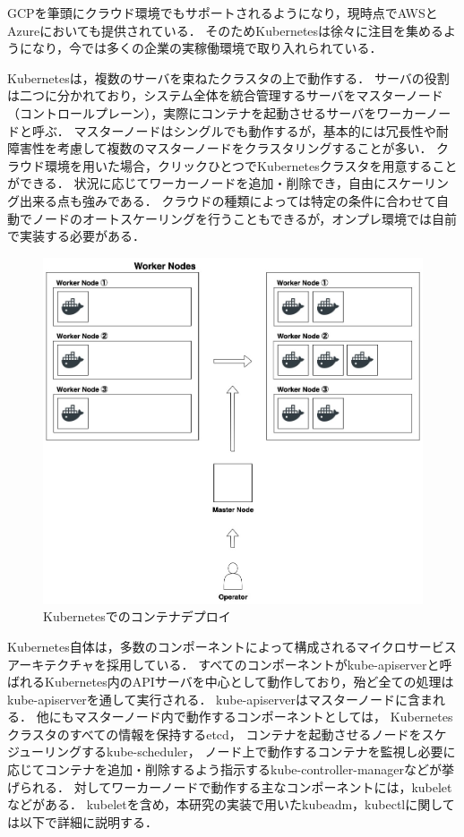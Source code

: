 GCPを筆頭にクラウド環境でもサポートされるようになり，現時点でAWSとAzureにおいても提供されている．
そのためKubernetesは徐々に注目を集めるようになり，今では多くの企業の実稼働環境で取り入れられている．

Kubernetesは，複数のサーバを束ねたクラスタの上で動作する．
サーバの役割は二つに分かれており，システム全体を統合管理するサーバをマスターノード（コントロールプレーン），実際にコンテナを起動させるサーバをワーカーノードと呼ぶ．
マスターノードはシングルでも動作するが，基本的には冗長性や耐障害性を考慮して複数のマスターノードをクラスタリングすることが多い．
クラウド環境を用いた場合，クリックひとつでKubernetesクラスタを用意することができる．
状況に応じてワーカーノードを追加・削除でき，自由にスケーリング出来る点も強みである．
クラウドの種類によっては特定の条件に合わせて自動でノードのオートスケーリングを行うこともできるが，オンプレ環境では自前で実装する必要がある．

\begin{figure}[htbp]
\begin{center}
    \includegraphics[width=\textwidth]{./figures/k8s-deploy-container.jpg}
    \caption{Kubernetesでのコンテナデプロイ}
\end{center}
\end{figure}

Kubernetes自体は，多数のコンポーネントによって構成されるマイクロサービスアーキテクチャを採用している．
すべてのコンポーネントがkube-apiserverと呼ばれるKubernetes内のAPIサーバを中心として動作しており，殆ど全ての処理はkube-apiserverを通して実行される．
kube-apiserverはマスターノードに含まれる．
他にもマスターノード内で動作するコンポーネントとしては，
Kubernetesクラスタのすべての情報を保持するetcd，
コンテナを起動させるノードをスケジューリングするkube-scheduler，
ノード上で動作するコンテナを監視し必要に応じてコンテナを追加・削除するよう指示するkube-controller-managerなどが挙げられる．
対してワーカーノードで動作する主なコンポーネントには，kubeletなどがある．
kubeletを含め，本研究の実装で用いたkubeadm，kubectlに関しては以下で詳細に説明する．

